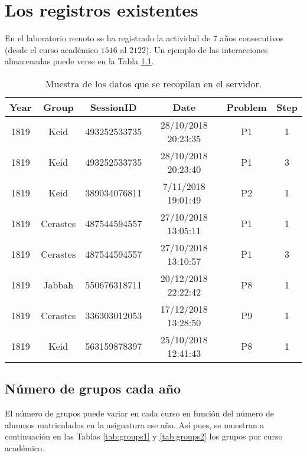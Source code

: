 \chapter{Los registros existentes}

En el laboratorio remoto se ha registrado la actividad de $7$ años consecutivos (desde el curso académico $1516$ al $2122$). Un ejemplo de las interacciones almacenadas puede verse en la Tabla \ref{tab:example}.

\begin{table}[H]
\centering
\caption{Muestra de los datos que se recopilan en el servidor.}
\label{tab:example}
\begin{tabular}{cccccc}
\hline
\textbf{Year} & \textbf{Group} & \textbf{SessionID} & \textbf{Date}       & \textbf{Problem} & \textbf{Step} \\ \hline
1819          & Keid           & 493252533735       & 28/10/2018 20:23:35 & P1               & 1             \\ 
1819          & Keid           & 493252533735       & 28/10/2018 20:23:40 & P1               & 3             \\ 
1819          & Keid           & 389034076811       & 7/11/2018 19:01:49  & P2               & 1             \\
1819          & Cerastes       & 487544594557       & 27/10/2018 13:05:11 & P1               & 1             \\
1819          & Cerastes       & 487544594557       & 27/10/2018 13:10:57 & P1               & 3             \\
1819          & Jabbah         & 550676318711       & 20/12/2018 22:22:42 & P8               & 1             \\
1819          & Cerastes       & 336303012053       & 17/12/2018 13:28:50 & P9               & 1             \\ 
1819          & Keid           & 563159878397       & 25/10/2018 12:41:43 & P8               & 1             \\ \hline
\end{tabular}
\end{table}

\section{Número de grupos cada año}

El número de grupos puede variar en cada curso en función del número de alumnos matriculados en la asignatura ese año. Así pues, se muestran a continuación en las Tablas \ref{tab:groups1} y \ref{tab:groups2} los grupos por curso académico.

